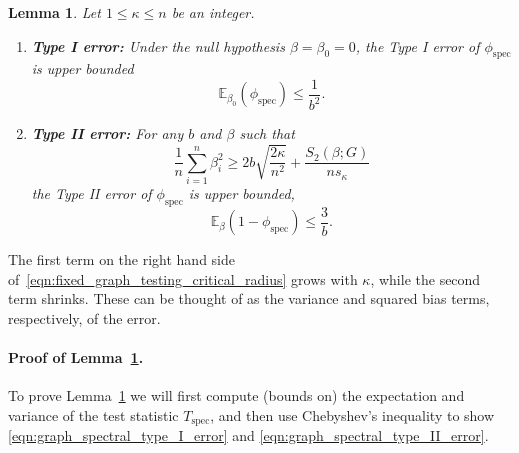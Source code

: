 \documentclass{article}
\newcommand{\1}{\mathbf{1}}
\newcommand{\spec}{\mathrm{spec}}
\theoremstyle{alden}
\theoremstyle{aldenthm}
\newtheorem{lemma}{Lemma}
\theoremstyle{definition}
\theoremstyle{remark}
\begin{document}
\begin{lemma}
	\label{lem:fixed_graph_testing}
	Let $1 \leq \kappa \leq n$ be an integer.
	\begin{enumerate}
		\item \textbf{Type I error:} Under the null hypothesis $\beta = \beta_0 = 0$, the Type I error of $\phi_{\spec}$ is upper bounded
		\begin{equation}
		\label{eqn:graph_spectral_type_I_error}
		\mathbb{E}_{\beta_0}(\phi_{\spec}) \leq \frac{1}{b^2}.
		\end{equation}
		\item \textbf{Type II error:} For any $b$ and $\beta$ such that
		\begin{equation}
		\label{eqn:fixed_graph_testing_critical_radius}
		\frac{1}{n} \sum_{i = 1}^{n} \beta_i^2 \geq 2b\sqrt{\frac{2\kappa}{n^2}} + \frac{S_2(\beta;G)}{ns_{\kappa}}
		\end{equation}
		the Type II error of $\phi_{\spec}$ is upper bounded,
		\begin{equation}
		\label{eqn:graph_spectral_type_II_error}
		\mathbb{E}_{\beta}(1 - \phi_{\spec}) \leq \frac{3}{b}.
		\end{equation}
	\end{enumerate}
\end{lemma}

The first term on the right hand side of~\eqref{eqn:fixed_graph_testing_critical_radius} grows with $\kappa$, while the second term shrinks. These can be thought of as the variance and squared bias terms, respectively, of the error.

\paragraph{Proof of Lemma~\ref{lem:fixed_graph_testing}.}

To prove Lemma~\ref{lem:fixed_graph_testing} we will first compute (bounds on) the expectation and variance of the test statistic $T_{\mathrm{spec}}$, and then use Chebyshev's inequality to show \eqref{eqn:graph_spectral_type_I_error} and \eqref{eqn:graph_spectral_type_II_error}.

\vspace{.2 in}
\end{document}
